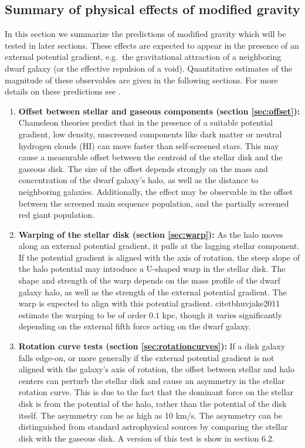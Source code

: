 \documentclass[useAMS,usenatbib,twocolumn]{mn2e}
\newcommand{\jakesays}[1]{{\color{red}[Jake says: #1]}}
\begin{document}
\subsection{Summary of physical effects of modified gravity}

In this section we summarize the  predictions of modified gravity
which will be tested in later sections.  These effects are
expected to appear in the presence of an external
potential gradient, e.g.\ the gravitational attraction of a neighboring
dwarf galaxy (or the effective repulsion of a void).
 Quantitative estimates of the magnitude of these
observables are given  in the following sections. For more
details on these predictions see \citet{bhuvjake2011}. 

\begin{enumerate}
\item \textbf{Offset between stellar and gaseous components (section
\ref{sec:offset}):}
Chameleon theories predict that in the presence of a suitable
potential gradient, low density, unscreened components like dark matter or
neutral hydrogen clouds (HI) can move faster than self-screened stars. 
This may cause a measurable offset between the
centroid of the stellar disk and the gaseous disk. 
The size of the offset
depends strongly on the mass and concentration of the dwarf galaxy's halo,
as well as the distance to neighboring galaxies.
Additionally, the effect may be observable in the offset between the
screened main sequence population, and the partially screened red
giant population.   

\item \textbf{Warping of the stellar disk (section \ref{sec:warp}):}
As the halo moves along an external potential gradient,
it pulls at the lagging stellar component.  If the potential gradient
is aligned with the axis of rotation, the steep slope of the halo potential
may introduce a U-shaped warp in the stellar disk.
The shape and strength of the warp depends on the mass profile of the dwarf
galaxy halo, as well as the strength of the external potential gradient. The
warp  
 is expected to align with this potential gradient.
citet{bhuvjake2011} estimate the warping to be of order $0.1$ kpc, though it
varies significantly depending on the external fifth force acting on the dwarf
galaxy.  

\item \textbf{Rotation curve tests (section \ref{sec:rotationcurves}):}
If a disk galaxy falls edge-on, or more generally if the external potential
gradient is not aligned with the galaxy's axis of
rotation, the offset between stellar and halo centers can perturb the stellar
disk
and cause an asymmetry in the stellar rotation curve. This is due to the fact
that the dominant force on the stellar disk is from the potential of the halo,
rather than the potential of the disk itself. The asymmetry
can be as high as 10 km/s. 
The asymmetry can be distinguished from standard astrophysical sources  
by comparing the stellar disk with the gaseous disk.  A version of this test is
show in section 6.2. 


\end{enumerate}
\end{document}
